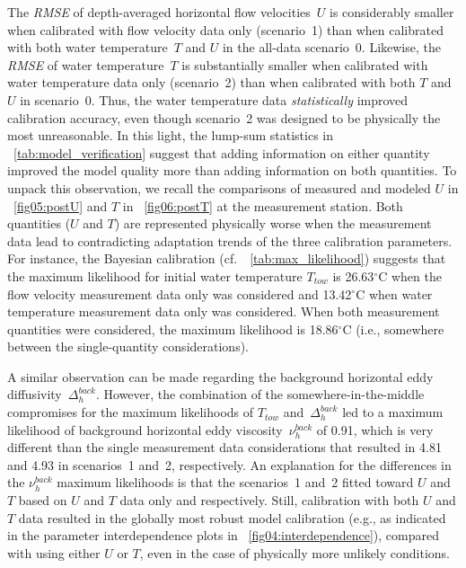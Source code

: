 \documentclass[draft,linenumbers,onecolumn]{agujournal2019} %
\begin{document}
The \textit{RMSE} of depth-averaged horizontal flow velocities~$U$ is considerably smaller when calibrated with flow velocity data only (scenario~1) than when calibrated with both water temperature~$T$ and $U$ in the all-data scenario~0. Likewise, the \textit{RMSE} of water temperature~$T$ is substantially smaller when calibrated with water temperature data only (scenario~2) than when calibrated with both $T$ and $U$ in scenario~0. Thus, the water temperature data \emph{statistically} improved calibration accuracy, even though scenario~2 was designed to be physically the most unreasonable. In this light, the lump-sum statistics in \tablename{~\ref{tab:model_verification}} suggest that adding information on either quantity improved the model quality more than adding information on both quantities. To unpack this observation, we recall the comparisons of measured and modeled $U$ in \figurename{~\ref{fig05:postU}} and $T$ in \figurename{~\ref{fig06:postT}} at the measurement station. Both quantities ($U$ and $T$) are represented physically worse when the measurement data lead to contradicting adaptation trends of the three calibration parameters. For instance, the Bayesian calibration (cf.~\tablename{~\ref{tab:max_likelihood}}) suggests that the maximum likelihood for initial water temperature $T_{tow}$ is 26.63$^{\circ}$C when the flow velocity measurement data only was considered and 13.42$^{\circ}$C when water temperature measurement data only was considered. When both measurement quantities were considered, the maximum likelihood is 18.86$^{\circ}$C (i.e., somewhere between the single-quantity considerations).

A similar observation can be made regarding the background horizontal eddy diffusivity~$\Delta_{h}^{back}$. However, the combination of the somewhere-in-the-middle compromises for the maximum likelihoods of ${T_{tow}}$ and~${\Delta_{h}^{back}}$ led to a maximum likelihood of background horizontal eddy viscosity~${\nu_{h}^{back}}$ of 0.91, which is very different than the single measurement data considerations that resulted in 4.81 and 4.93 in scenarios~1 and~2, respectively. An explanation for the differences in the ${\nu_{h}^{back}}$ maximum likelihoods is that the scenarios~1 and~2 fitted toward $U$ and $T$ based on $U$ and $T$ data only and respectively. Still, calibration with both $U$ and $T$ data resulted in the globally most robust model calibration (e.g., as indicated in the parameter interdependence plots in \figurename{~\ref{fig04:interdependence}}), compared with using either $U$ or $T$, even in the case of physically more unlikely conditions.
\end{document}
